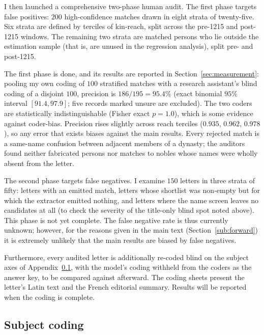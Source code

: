 \documentclass[12pt]{article}
\theoremstyle{definition}
\theoremstyle{remark}
\begin{document}
I then launched a comprehensive two-phase human audit. The first phase targets false positives: $200$ high-confidence matches drawn in eight strata of twenty-five. Six strata are defined by terciles of kin-reach, split across the pre-1215 and post-1215 windows. The remaining two strata are matched persons who lie outside the estimation sample (that is, are unused in the regression analysis), split pre- and post-1215.

The first phase is done, and its results are reported in Section~\ref{sec:measurement}: pooling my own coding of $100$ stratified matches with a research assistant's blind coding of a disjoint $100$, precision is $186/195 = 95.4\%$ (exact binomial $95\%$ interval $[91.4, 97.9]$; five records marked unsure are excluded). The two coders are statistically indistinguishable (Fisher exact $p = 1.0$), which is some evidence against coder-bias. Precision rises slightly across reach terciles ($0.935$, $0.962$, $0.978$), so any error that exists biases against the main results. Every rejected match is a same-name confusion between adjacent members of a dynasty; the auditors found neither fabricated persons nor matches to nobles whose names were wholly absent from the letter.

The second phase targets false negatives. I examine $150$ letters in three strata of fifty: letters with an emitted match, letters whose shortlist was non-empty but for which the extractor emitted nothing, and letters where the name screen leaves no candidates at all (to check the severity of the title-only blind spot noted above). This phase is not yet complete. The false negative rate is thus currently unknown; however, for the reasons given in the main text (Section~\ref{sub:forward}) it is extremely unlikely that the main results are biased by false negatives.

Furthermore, every audited letter is additionally re-coded blind on the subject axes of Appendix~\ref{app:data-coding}, with the model's coding withheld from the coders as the answer key, to be compared against afterward. The coding sheets present the letter's Latin text and the French editorial summary. Results will be reported when the coding is complete.

\subsection{Subject coding}
\label{app:data-coding}
\end{document}
